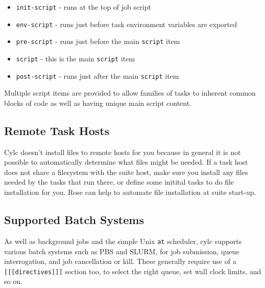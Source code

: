 \begin{itemize}
    \item \lstinline=init-script= - runs at the top of job script
    \item \lstinline=env-script= - runs just before task environment variables are exported
    \item \lstinline=pre-script= - runs just before the main \lstinline=script= item
    \item \lstinline=script= - this is the main \lstinline=script= item
    \item \lstinline=post-script= - runs just after the main \lstinline=script= item
\end{itemize}

Multiple script items are provided to allow families of tasks to inherent common
blocks of code as well as having unique main script content.

\subsection{Remote Task Hosts}

Cylc doesn't install files to remote hosts for you because in general it is not
possible to automatically determine what files might be needed. If a task host
does not share a filesystem with the suite host, make sure you install any
files needed by the tasks that run there, or define some initital tasks to do
file installation for you.  Rose can help to automate file installation at
suite start-up.

\subsection{Supported Batch Systems}

As well as background jobs and the simple Unix \lstinline=at= scheduler, cylc
supports various batch systems such as PBS and SLURM, for job submission,
queue interrogation, and job cancellation or kill. These generally require use
of a \lstinline=[[[directives]]]= section too, to select the right queue, set
wall clock limits, and so on.


